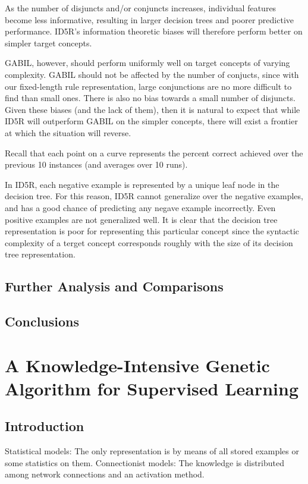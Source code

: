 \documentclass[12pt]{article}
\begin{document}
As the number of disjuncts and/or conjuncts increases, individual features become less informative, resulting in larger decision trees and poorer predictive performance. ID5R's information theoretic biases will therefore perform better on simpler target concepts.

GABIL, however, should perform uniformly well on target concepts of varying complexity. GABIL should not be affected by the number of conjucts, since with our fixed-length rule representation, large conjunctions are no more difficult to find than small ones. There is also no bias towards a small number of disjuncts. Given these biases (and the lack of them), then it is natural to expect that while ID5R will outperform GABIL on the simpler concepts, there will exist a frontier at which the situation will reverse.

Recall that each point on a curve represents the percent correct achieved over the previous 10 instances (and averages over 10 runs).

In ID5R, each negative example is represented by a unique leaf node in the decision tree. For this reason, ID5R cannot generalize over the negative examples, and has a good chance of predicting any negave example incorrectly. Even positive examples are not generalized well. It is clear that the decision tree representation is poor for representing this particular concept since the syntactic complexity of a terget concept corresponds roughly with the size of its decision tree representation.

\subsection{Further Analysis and Comparisons}

\subsection{Conclusions}
\clearpage

\section{A Knowledge-Intensive Genetic Algorithm for Supervised Learning}

\subsection{Introduction}
Statistical models: The only representation is by means of all stored examples or some statistics on them. Connectionist models: The knowledge is distributed among network connections and an activation method.
\end{document}
